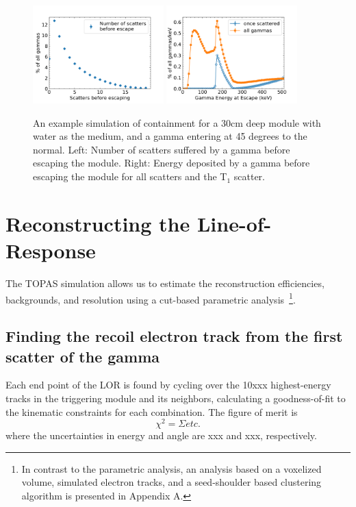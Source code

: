 \documentclass[12pt]{article}
\begin{document}
\begin{figure}[hb!]
  \centering
  \includegraphics[width=0.45\textwidth]{Figures/scatters_before_escape_v3.png}
   \hfil
   \includegraphics[width=0.45\textwidth]{Figures/energy_at_escape_v2.png}
\caption{An example simulation of containment for a 30cm deep module with water as the medium, and a gamma
entering at 45 degrees to the normal. Left: Number of scatters suffered by a gamma before escaping the module. Right: Energy deposited by a gamma before escaping the module for all scatters and the T$_1$ scatter. }
\label{fig:escaping}
\end{figure}
\clearpage

\section{Reconstructing the Line-of-Response}
\label{Reconstruction}
The TOPAS simulation allows us to estimate the reconstruction efficiencies, backgrounds, and resolution using a cut-based parametric analysis~\footnote{In contrast to the parametric analysis, an analysis based on a voxelized volume, simulated electron tracks, and a seed-shoulder based clustering algorithm is presented in Appendix A.}.

 \subsection{Finding the recoil electron track from the first scatter of the gamma}

Each end point of the LOR is found by cycling over the 10xxx highest-energy tracks in the triggering module and its neighbors, calculating a goodness-of-fit to the kinematic constraints for each combination. The figure of merit is
 \begin{equation}
\chi^2 = \Sigma etc.
\end{equation}
where the uncertainties in energy and angle are xxx and xxx, respectively.
\end{document}
